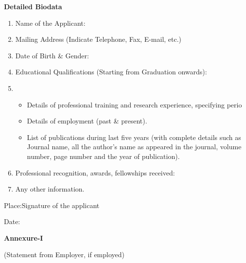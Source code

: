\documentclass[11pt]{article}
\begin{document}
\newpage
\begin{center}
  {\bf Detailed Biodata}
\end{center}

\begin{enumerate}
  \item Name of the Applicant:
  \item Mailing Address (Indicate Telephone, Fax, E-mail, etc.)
  \item Date of Birth \& Gender:
  \item Educational Qualifications (Starting from Graduation onwards):
  \item
    \begin{itemize}
      \item Details of professional training and research experience, specifying perio
      \item Details of employment (past \& present).
      \item List of publications during last five years (with complete details such as Journal name, all the author’s name as appeared in the journal, volume number, page number and the year of publication).
    \end{itemize}
  \item Professional recognition, awards, fellowships received:
  \item Any other information.
\end{enumerate}

\vspace{5cm}
Place:\hfill Signature of the applicant

Date:

\newpage
\begin{center}
  {\bf Annexure-I}

  (Statement from Employer, if employed)
\end{center}
\end{document}
